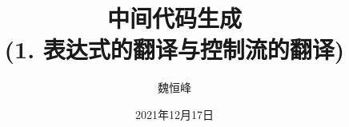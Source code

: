 \documentclass[]{beamer}
\title[语义分析]{中间代码生成 \\ (1. 表达式的翻译与控制流的翻译)}
\author[魏恒峰]{\large 魏恒峰}
\institute{hfwei@nju.edu.cn}
\date{2021年12月17日}
\begin{document}
\maketitle

% 







\thankyou{}

\end{document}
